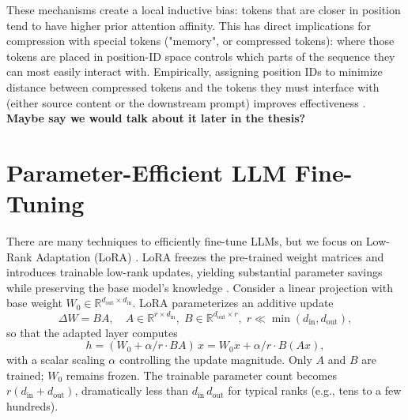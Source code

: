 These mechanisms create a local inductive bias: tokens that are closer in position tend to have higher prior attention affinity.
This has direct implications for compression with special tokens ("memory", or compressed tokens): where those tokens are placed in position-ID space controls which parts of the sequence they can most easily interact with. 
Empirically, assigning position IDs to minimize distance between compressed tokens and the tokens they must interface with (either source content or the downstream prompt) improves effectiveness \cite{zhao_position_2025}. 
\textbf{Maybe say we would talk about it later in the thesis?}

% 


\section{Parameter-Efficient LLM Fine-Tuning}

There are many techniques to efficiently fine-tune LLMs, but we focus on Low-Rank Adaptation (LoRA) \cite{hu2021lora}.
LoRA freezes the pre-trained weight matrices and introduces trainable low-rank updates, yielding substantial parameter savings while preserving the base model’s knowledge \cite{hu2021lora}. 
Consider a linear projection with base weight \(W_0 \in \mathbb{R}^{d_{\text{out}}\times d_{\text{in}}}\). 
LoRA parameterizes an additive update
\[
\Delta W = B A,\quad A \in \mathbb{R}^{r \times d_{\text{in}}},\; B \in \mathbb{R}^{d_{\text{out}} \times r},\; r \ll \min(d_{\text{in}}, d_{\text{out}}),
\]
so that the adapted layer computes
\[
h = (W_0 + \alpha / r \cdot B A)\, x = W_0 x + \alpha / r \cdot B (A x),
\]
with a scalar scaling \(\alpha\) controlling the update magnitude. Only \(A\) and \(B\) are trained; \(W_0\) remains frozen. The trainable parameter count becomes \(r(d_{\text{in}} + d_{\text{out}})\), dramatically less than \(d_{\text{in}}\, d_{\text{out}}\) for typical ranks (e.g., tens to a few hundreds).

